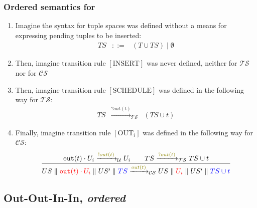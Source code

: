 \documentclass[presentation]{beamer}\mode<presentation>{\usetheme{AMSCesenaPurpleAndGold}}
\begin{document}
\begin{frame}
\frametitle{Ordered semantics for \linda{}}

    \begin{enumerate}
        \item Imagine the syntax for tuple spaces was defined without a means for expressing pending tuples to be inserted:
        \[\begin{array}{rcl}
            TS &::=& (T \cup TS) \mid \emptyset
        \end{array}\]
        
        \vfill
        
        \item Then, imagine transition rule $[\text{INSERT}]$ was never defined, neither for $\mathcal{TS}$ nor for $\mathcal{CS}$
        
        \vfill
        
        \item Then, imagine transition rule $[\text{SCHEDULE}]$ was defined in the following way for $\mathcal{TS}$:
        \[\begin{array}{rcl}
            TS &\xrightarrow{?out(t)}_\mathcal{TS}& (TS \cup t)
        \end{array}\]
        
        \vfill
        
        \item Finally, imagine transition rule $[\text{OUT}_i]$ was defined in the following way for $\mathcal{CS}$:
        \[
            \frac{
                \mathtt{out}(t) \cdot U_i \xrightarrow{\highlightG{!out(t)}}_\mathcal{U} U_i 
                \qquad
                TS \xrightarrow{\highlightG{?out(t)}}_\mathcal{TS} TS \cup t 
            }{
                US \parallel \highlightR{\mathtt{out}(t) \cdot U_i} \parallel US' \parallel \highlightB{TS}
                \xrightarrow{\highlightG{out(t)}}_\mathcal{CS}
                US \parallel \highlightR{U_i} \parallel US' \parallel \highlightB{TS \cup t }
            }
        \]
    \end{enumerate}

\end{frame}

\startExercise

\subsection{Out-Out-In-In, \emph{ordered}}
\end{document}
